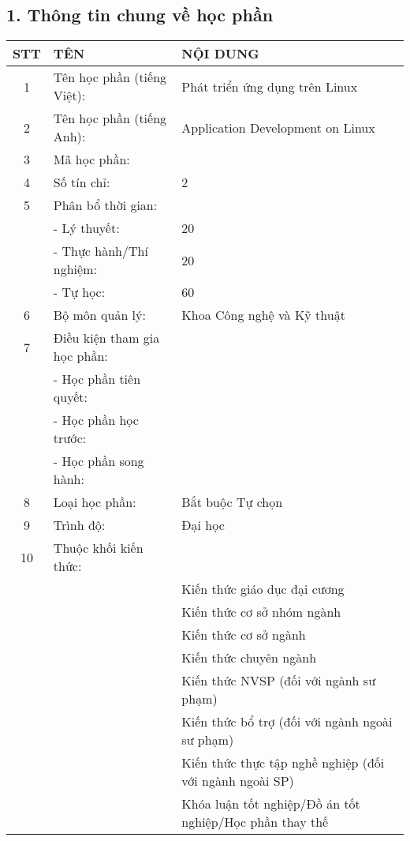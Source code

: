 \subsection*{1. Thông tin chung về học phần}
\begin{tabular}{|c|p{5cm}|p{9cm}|}
\hline
\textbf{STT} & \textbf{TÊN} & \textbf{NỘI DUNG} \\
\hline
1 & Tên học phần (tiếng Việt): & Phát triển ứng dụng trên Linux \\
\hline
2 & Tên học phần (tiếng Anh): & Application Development on Linux \\
\hline
3 & Mã học phần: & \\
\hline
4 & Số tín chỉ: & 2 \\
\hline
5 & Phân bổ thời gian: & \\
\hline
  & - Lý thuyết: & 20 \\
\hline
  & - Thực hành/Thí nghiệm: & 20 \\
\hline
  & - Tự học: & 60 \\
\hline
6 & Bộ môn quản lý: & Khoa Công nghệ và Kỹ thuật \\
\hline
7 & Điều kiện tham gia học phần: & \\
\hline
  & - Học phần tiên quyết: & \\
\hline
  & - Học phần học trước: & \\
\hline
  & - Học phần song hành: & \\
\hline
8 & Loại học phần: & \checkedbox{} Bắt buộc \quad \uncheckedbox{} Tự chọn \\
\hline
9 & Trình độ: & Đại học \\
\hline
10 & Thuộc khối kiến thức: & \\
\hline
\  & & \uncheckedbox{} Kiến thức giáo dục đại cương \\
\hline
\  & & \uncheckedbox{} Kiến thức cơ sở nhóm ngành \\
\hline
\  & & \uncheckedbox{} Kiến thức cơ sở ngành \\
\hline
\  & & \checkedbox{} Kiến thức chuyên ngành \\
\hline
\  & & \uncheckedbox{} Kiến thức NVSP (đối với ngành sư phạm) \\
\hline
\  & & \uncheckedbox{} Kiến thức bổ trợ (đối với ngành ngoài sư phạm) \\
\hline
\  & & \uncheckedbox{} Kiến thức thực tập nghề nghiệp (đối với ngành ngoài SP) \\
\hline
\  & & \uncheckedbox{} Khóa luận tốt nghiệp/Đồ án tốt nghiệp/Học phần thay thế \\
\hline
\end{tabular}